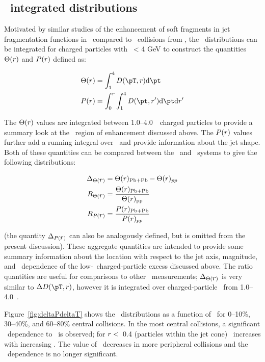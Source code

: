 \subsection{\pt\ integrated distributions}
\label{sec:discussion_int}
Motivated by similar studies of the enhancement of soft fragments in 
jet fragmentation functions in \pbpb\ compared to \pp\ collisions from \cite{Aaboud:2018hpb}, the \Dptr\ distributions can be integrated for charged particles with \pt\ < 4 GeV to construct the quantities $\Theta(\mbox{$r$})$ and $P(\mbox{$r$})$ defined as:

\begin{align*}
   \Theta(\rvar) &= \int_1^{4} \Dptr  \fd \pt \\
   P(\rvar) &= \int_0^r \int_1^{4} D(\pt, r') \fd \pt \fd r'
\end{align*}

The $\Theta(\mbox{$r$})$ values are integrated between 1.0--4.0~\GeV\ charged particles to provide a summary look at
the \pt\ region of enhancement discussed above.  The $P(\mbox{$r$})$ values further add a running integral over \rvar\
and provide information about the jet shape.
Both of these quantities can be compared between the \pp\ and \pbpb\ systems to give the following distributions:

\begin{align*}
   \Delta_{\Theta(\mbox{$r$})} &= \Theta(\mbox{$r$})_{\mathrm{Pb+Pb}} - \Theta(\mbox{$r$})_{pp} \\
   R_{\Theta(\mbox{$r$})} &= \frac{\Theta(\mbox{$r$})_{\mathrm{Pb+Pb}}}{\Theta(\mbox{$r$})_{\mathrm{pp}}} \\
   R_{P(\mbox{$r$})} &= \frac{P(\mbox{$r$})_{\mathrm{Pb+Pb}}}{P(\mbox{$r$})_{pp}}
\end{align*}

(the quantity $\Delta_{P(\mbox{$r$})}$ can also be analogously defined, but is omitted from the present discussion).
These aggregate quantities are intended to provide some summary information about the location with respect to the 
jet axis, magnitude, and \ptjet\ dependence of the low-\pt\ charged-particle excess discussed above.
The ratio quantities are useful for comparisons to other \pbpb\ measurements; $\Delta_{\Theta(\mbox{$r$})}$ is very similar 
to $\DeltaDptr$, however it is integrated over charged-particle \pt\ from 1.0--4.0~\GeV.

Figure~\ref{fig:deltaPdeltaT} shows the \DeltaTheta\ distributions as a function of \rvar\ for 0--10\%, 30--40\%,
and 60--80\% central collisions. 
In the most central collisions, a significant \ptjet\ dependence to \DeltaTheta\ is observed; for $\mbox{$r$} <$~0.4 (particles
within the jet cone) \DeltaTheta\ increases with increasing \ptjet.
The value of \DeltaTheta\ decreases in more peripheral collisions and the \ptjet\ dependence is no longer significant.

